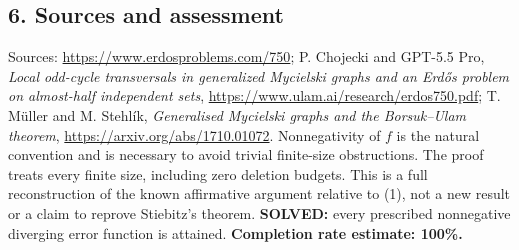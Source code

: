 \subsection*{6. Sources and assessment}
Sources: \url{https://www.erdosproblems.com/750}; P. Chojecki and GPT-5.5 Pro, \emph{Local odd-cycle transversals in generalized Mycielski graphs and an Erd\H{o}s problem on almost-half independent sets}, \url{https://www.ulam.ai/research/erdos750.pdf}; T. M\"uller and M. Stehl\'ik, \emph{Generalised Mycielski graphs and the Borsuk--Ulam theorem}, \url{https://arxiv.org/abs/1710.01072}.
Nonnegativity of $f$ is the natural convention and is necessary to avoid trivial finite-size obstructions. The proof treats every finite size, including zero deletion budgets. This is a full reconstruction of the known affirmative argument relative to (1), not a new result or a claim to reprove Stiebitz's theorem.
\textbf{SOLVED:} every prescribed nonnegative diverging error function is attained.
\textbf{Completion rate estimate: 100\%.}

